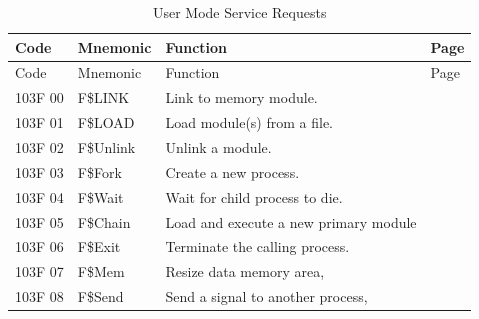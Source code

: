 \documentclass[
]{article}
\begin{document}
\begin{longtable}[]{@{}
  >{\raggedright\arraybackslash}p{}
  >{\raggedright\arraybackslash}p{}
  >{\raggedright\arraybackslash}p{}
  >{\raggedright\arraybackslash}p{}@{}}
\caption{User Mode Service Requests}\tabularnewline
\toprule\noalign{}
\begin{minipage}[b]{\linewidth}\raggedright
Code
\end{minipage} & \begin{minipage}[b]{\linewidth}\raggedright
Mnemonic
\end{minipage} & \begin{minipage}[b]{\linewidth}\raggedright
Function
\end{minipage} & \begin{minipage}[b]{\linewidth}\raggedright
Page
\end{minipage} \\
\midrule\noalign{}
\endfirsthead
\toprule\noalign{}
\begin{minipage}[b]{\linewidth}\raggedright
Code
\end{minipage} & \begin{minipage}[b]{\linewidth}\raggedright
Mnemonic
\end{minipage} & \begin{minipage}[b]{\linewidth}\raggedright
Function
\end{minipage} & \begin{minipage}[b]{\linewidth}\raggedright
Page
\end{minipage} \\
\midrule\noalign{}
\endhead
\bottomrule\noalign{}
\endlastfoot
103F 00 & F\$LINK & Link to memory module. & \\
103F 01 & F\$LOAD & Load module(s) from a file. & \\
103F 02 & F\$Unlink & Unlink a module. & \\
103F 03 & F\$Fork & Create a new process. & \\
103F 04 & F\$Wait & Wait for child process to die. & \\
103F 05 & F\$Chain & Load and execute a new primary module & \\
103F 06 & F\$Exit & Terminate the calling process. & \\
103F 07 & F\$Mem & Resize data memory area, & \\
103F 08 & F\$Send & Send a signal to another process, & \\

\end{longtable}
\end{document}

